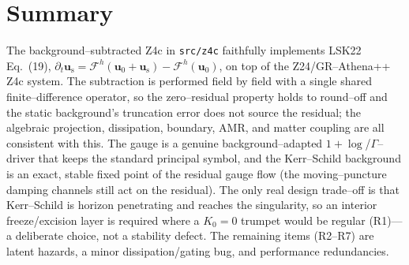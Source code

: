 \documentclass[11pt]{article}
\newcommand{\file}[1]{\texttt{#1}}
\newcommand{\bg}[1]{#1_{0}}
\newcommand{\res}[1]{#1_{\mathrm s}}
\newcommand{\Fop}{\mathcal{F}}            %
\newcommand{\Fnum}{\Fop^{h}}              %
\begin{document}
\section{Summary}
The background--subtracted Z4c in \file{src/z4c} faithfully implements LSK22
Eq.~(19), $\partial_t\res{\bm u}=\Fnum(\bg{\bm u}+\res{\bm u})-\Fnum(\bg{\bm
u})$, on top of the Z24/GR--Athena++ Z4c system. The subtraction is performed
field by field with a single shared finite--difference operator, so the
zero--residual property holds to round--off and the static background's
truncation error does not source the residual; the algebraic projection,
dissipation, boundary, AMR, and matter coupling are all consistent with this.
The gauge is a genuine background--adapted $1+\log$/$\Gamma$--driver that keeps
the standard principal symbol, and the Kerr--Schild background is an exact,
stable fixed point of the residual gauge flow (the moving--puncture damping
channels still act on the residual). The only real design trade--off is that
Kerr--Schild is horizon penetrating and reaches the singularity, so an interior
freeze/excision layer is required where a $K_0=0$ trumpet would be regular
(R1)---a deliberate choice, not a stability defect. The remaining items
(R2--R7) are latent hazards, a minor dissipation/gating bug, and performance
redundancies.
\end{document}
